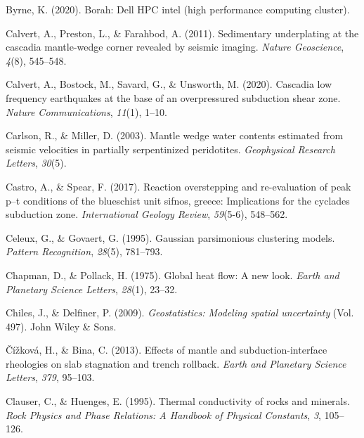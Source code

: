\begin{CSLReferences}{1}{1}
\leavevmode{}%
Byrne, K. (2020). Borah: Dell HPC intel (high performance computing cluster).

\leavevmode{}%
Calvert, A., Preston, L., \& Farahbod, A. (2011). Sedimentary underplating at the cascadia mantle-wedge corner revealed by seismic imaging. \emph{Nature Geoscience}, \emph{4}(8), 545--548.

\leavevmode{}%
Calvert, A., Bostock, M., Savard, G., \& Unsworth, M. (2020). Cascadia low frequency earthquakes at the base of an overpressured subduction shear zone. \emph{Nature Communications}, \emph{11}(1), 1--10.

\leavevmode{}%
Carlson, R., \& Miller, D. (2003). Mantle wedge water contents estimated from seismic velocities in partially serpentinized peridotites. \emph{Geophysical Research Letters}, \emph{30}(5).

\leavevmode{}%
Castro, A., \& Spear, F. (2017). Reaction overstepping and re-evaluation of peak p--t conditions of the blueschist unit sifnos, greece: Implications for the cyclades subduction zone. \emph{International Geology Review}, \emph{59}(5-6), 548--562.

\leavevmode{}%
Celeux, G., \& Govaert, G. (1995). Gaussian parsimonious clustering models. \emph{Pattern Recognition}, \emph{28}(5), 781--793.

\leavevmode{}%
Chapman, D., \& Pollack, H. (1975). Global heat flow: A new look. \emph{Earth and Planetary Science Letters}, \emph{28}(1), 23--32.

\leavevmode{}%
Chiles, J., \& Delfiner, P. (2009). \emph{Geostatistics: Modeling spatial uncertainty} (Vol. 497). John Wiley \& Sons.

\leavevmode{}%
Čížková, H., \& Bina, C. (2013). Effects of mantle and subduction-interface rheologies on slab stagnation and trench rollback. \emph{Earth and Planetary Science Letters}, \emph{379}, 95--103.

\leavevmode{}%
Clauser, C., \& Huenges, E. (1995). Thermal conductivity of rocks and minerals. \emph{Rock Physics and Phase Relations: A Handbook of Physical Constants}, \emph{3}, 105--126.


\end{CSLReferences}
